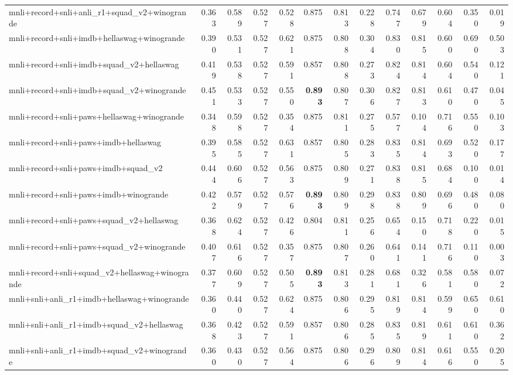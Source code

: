 \begin{table}[t]
\begin{tabular}{lrrrrrrrrrrrr}
    mnli+record+snli+anli\_r1+squad\_v2+winogrande & 0.363 & 0.589 & 0.527 & 0.528 & 0.875 & 0.813 & 0.228 & 0.747 & 0.679 & 0.604 & 0.350 & 0.019 \\
    mnli+record+snli+imdb+hellaswag+winogrande & 0.390 & 0.531 & 0.527 & 0.621 & 0.875 & 0.808 & 0.304 & 0.830 & 0.815 & 0.600 & 0.690 & 0.503 \\
    mnli+record+snli+imdb+squad\_v2+hellaswag & 0.419 & 0.538 & 0.527 & 0.591 & 0.857 & 0.808 & 0.273 & 0.824 & 0.814 & 0.604 & 0.540 & 0.121 \\
    mnli+record+snli+imdb+squad\_v2+winogrande & 0.451 & 0.533 & 0.527 & 0.550 & \textbf{0.893} & 0.807 & 0.306 & 0.827 & 0.813 & 0.610 & 0.470 & 0.045 \\
    mnli+record+snli+paws+hellaswag+winogrande & 0.348 & 0.598 & 0.527 & 0.354 & 0.875 & 0.811 & 0.275 & 0.577 & 0.104 & 0.716 & 0.550 & 0.103 \\
    mnli+record+snli+paws+imdb+hellaswag & 0.395 & 0.585 & 0.527 & 0.631 & 0.857 & 0.805 & 0.283 & 0.835 & 0.814 & 0.693 & 0.520 & 0.177 \\
    mnli+record+snli+paws+imdb+squad\_v2 & 0.444 & 0.606 & 0.527 & 0.563 & 0.875 & 0.809 & 0.271 & 0.838 & 0.815 & 0.684 & 0.100 & 0.014 \\
    mnli+record+snli+paws+imdb+winogrande & 0.422 & 0.579 & 0.527 & 0.576 & \textbf{0.893} & 0.809 & 0.298 & 0.838 & 0.809 & 0.696 & 0.480 & 0.080 \\
    mnli+record+snli+paws+squad\_v2+hellaswag & 0.368 & 0.624 & 0.527 & 0.426 & 0.804 & 0.811 & 0.256 & 0.654 & 0.150 & 0.718 & 0.220 & 0.015 \\
    mnli+record+snli+paws+squad\_v2+winogrande & 0.407 & 0.616 & 0.527 & 0.357 & 0.875 & 0.807 & 0.260 & 0.641 & 0.141 & 0.716 & 0.110 & 0.003 \\
    mnli+record+snli+squad\_v2+hellaswag+winogrande & 0.377 & 0.609 & 0.527 & 0.505 & \textbf{0.893} & 0.813 & 0.281 & 0.681 & 0.326 & 0.581 & 0.580 & 0.072 \\
    mnli+snli+anli\_r1+imdb+hellaswag+winogrande & 0.360 & 0.440 & 0.527 & 0.624 & 0.875 & 0.806 & 0.295 & 0.819 & 0.814 & 0.599 & 0.650 & 0.610 \\
    mnli+snli+anli\_r1+imdb+squad\_v2+hellaswag & 0.368 & 0.423 & 0.527 & 0.591 & 0.857 & 0.806 & 0.285 & 0.835 & 0.819 & 0.611 & 0.610 & 0.362 \\
    mnli+snli+anli\_r1+imdb+squad\_v2+winogrande & 0.360 & 0.430 & 0.527 & 0.564 & 0.875 & 0.806 & 0.296 & 0.809 & 0.814 & 0.616 & 0.550 & 0.205 \\

\end{tabular}
\end{table}
